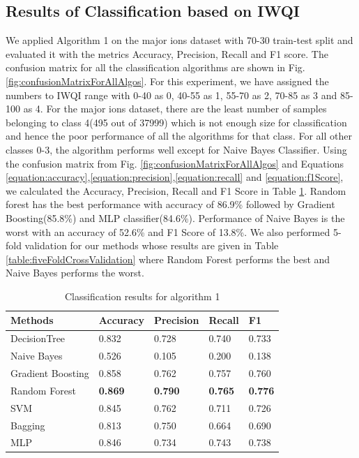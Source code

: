 \subsection{Results of Classification based on IWQI}
\label{subsection:resultsOfClassificationBasedOnIWQI}
We applied Algorithm 1 on the major ions dataset with 70-30 train-test split and evaluated it with the metrics Accuracy, Precision, Recall and F1 score. The confusion matrix for all the classification algorithms are shown in Fig. \ref{fig:confusionMatrixForAllAlgos}. For this experiment, we have assigned the numbers to IWQI range with 0-40 as 0, 40-55 as 1, 55-70 as 2, 70-85 as 3 and 85-100 as 4. For the major ions dataset, there are the least number of samples belonging to class 4(495 out of 37999) which is not enough size for classification and hence the poor performance of all the algorithms for that class. For all other classes 0-3, the algorithm performs well except for Naive Bayes Classifier. Using the confusion matrix from Fig. \ref{fig:confusionMatrixForAllAlgos} and Equations \ref{equation:accuracy},\ref{equation:precision},\ref{equation:recall} and \ref{equation:f1Score}, we calculated the Accuracy, Precision, Recall and F1 Score in Table \ref{table:classificationResults}. Random forest has the best performance with accuracy of 86.9\% followed by Gradient Boosting(85.8\%) and MLP classifier(84.6\%). Performance of Naive Bayes is the worst with an accuracy of 52.6\% and F1 Score of 13.8\%. We also performed 5-fold validation for our methods whose results are given in Table \ref{table:fiveFoldCrossValidation} where Random Forest performs the best and Naive Bayes performs the worst.

\begin{table}[H]
    \centering
    \begin{tabular}{|l|l|l|l|l|}
    \hline
        \textbf{Methods} & \textbf{Accuracy} & \textbf{Precision} & \textbf{Recall} & \textbf{F1} \\ \hline
        DecisionTree & 0.832 & 0.728 & 0.740 & 0.733 \\ \hline
        Naive Bayes & 0.526 & 0.105 & 0.200 & 0.138 \\ \hline
        Gradient Boosting & 0.858 & 0.762 & 0.757 & 0.760 \\ \hline
        Random Forest & \textbf{0.869} & \textbf{0.790} & \textbf{0.765} & \textbf{0.776} \\ \hline
        SVM & 0.845 & 0.762 & 0.711 & 0.726 \\ \hline
        Bagging & 0.813 & 0.750 & 0.664 & 0.690 \\ \hline
        MLP & 0.846 & 0.734 & 0.743 & 0.738 \\ \hline
    \end{tabular}
    \caption{Classification results for algorithm 1}
    \label{table:classificationResults}
\end{table}

